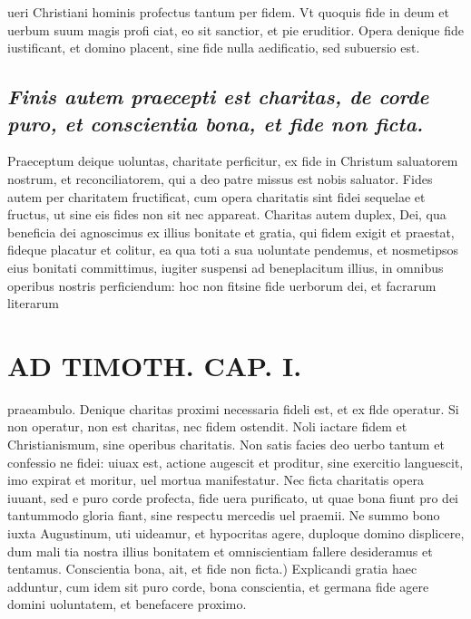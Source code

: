 \documentclass{article}
\begin{document}
\begin{pages}
ueri Christiani hominis profectus tantum per fidem. Vt quoquis fide in deum et uerbum suum magis profi ciat, eo sit sanctior, et pie eruditior. Opera denique fide iustificant, et domino placent, sine fide nulla aedificatio, sed subuersio est.  \pend
{}
{}
\subsection*{\textit{Finis autem praecepti est charitas, de corde puro, et conscientia bona, et fide non ficta. }}\pstart Praeceptum deique uoluntas, charitate perficitur, ex fide in Christum saluatorem nostrum, et reconciliatorem, qui a deo patre missus est nobis saluator. Fides autem per charitatem fructificat, cum opera charitatis sint fidei sequelae et fructus, ut sine eis fides non sit nec appareat. Charitas autem duplex, Dei, qua beneficia dei agnoscimus ex illius bonitate et gratia, qui fidem exigit et praestat, fideque placatur et colitur, ea qua toti a sua uoluntate pendemus, et nosmetipsos eius bonitati committimus, iugiter suspensi ad beneplacitum illius, in omnibus operibus nostris perficiendum: hoc non fitsine fide uerborum dei, et facrarum literarum  \pend
\section*{AD TIMOTH. CAP. I. }
\marginpar{[ p.469 ]}\pstart praeambulo. Denique charitas proximi necessaria fideli est, et ex flde operatur. Si non operatur, non est charitas, nec fidem ostendit. Noli iactare fidem et Christianismum, sine operibus charitatis. Non satis facies deo uerbo tantum et confessio ne fidei: uiuax est, actione augescit et proditur, sine exercitio languescit, imo expirat et moritur, uel mortua manifestatur. Nec ficta charitatis opera iuuant, sed e puro corde profecta, fide uera purificato, ut quae bona fiunt pro dei tantummodo gloria fiant, sine respectu mercedis uel praemii. Ne summo bono iuxta Augustinum, uti uideamur, et hypocritas agere, duploque domino displicere, dum mali tia nostra illius bonitatem et omniscientiam fallere desideramus et tentamus. Conscientia bona, ait, et fide non ficta.) Explicandi gratia haec adduntur, cum idem sit puro corde, bona conscientia, et germana fide agere domini uoluntatem, et benefacere proximo.  \pend
{}
{}

\end{pages}
\end{document}
